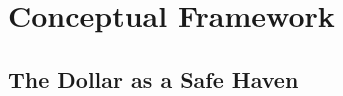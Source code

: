 



\chapter{Conceptual Framework}
\label{ch:framework}

\section{The Dollar as a Safe Haven}
\label{sec:fw_safehaven}

